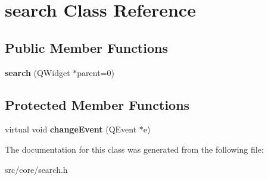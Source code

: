 \hypertarget{classsearch}{
\section{search Class Reference}
\label{classsearch}
}
\subsection*{Public Member Functions}
\begin{DoxyCompactItemize}
\item 
\hypertarget{classsearch_aee7acbb1c039e29d488050e3820a7c0a}{
{\bfseries search} (QWidget $\ast$parent=0)}
\label{classsearch_aee7acbb1c039e29d488050e3820a7c0a}

\end{DoxyCompactItemize}
\subsection*{Protected Member Functions}
\begin{DoxyCompactItemize}
\item 
\hypertarget{classsearch_af460ada0a65b279e12a4ba90604d5254}{
virtual void {\bfseries changeEvent} (QEvent $\ast$e)}
\label{classsearch_af460ada0a65b279e12a4ba90604d5254}

\end{DoxyCompactItemize}


The documentation for this class was generated from the following file:\begin{DoxyCompactItemize}
\item 
src/core/search.h\end{DoxyCompactItemize}
